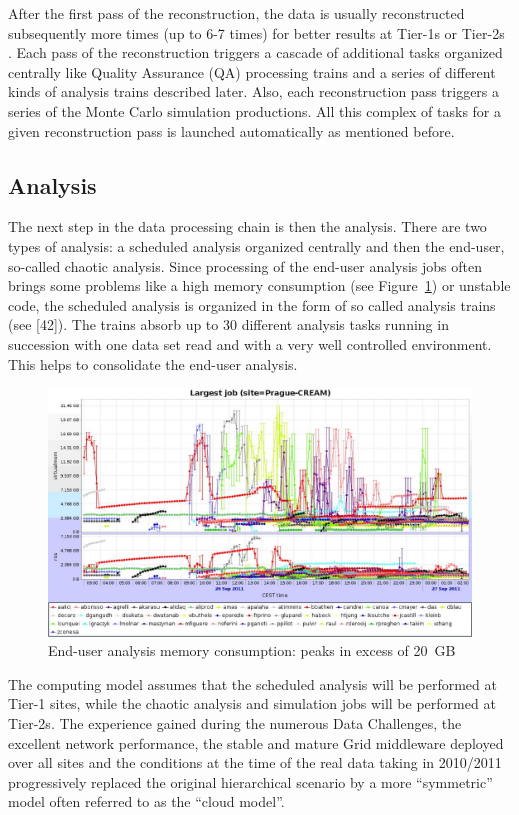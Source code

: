 After the first pass of the reconstruction, the data is usually
reconstructed subsequently more times (up to 6-7 times) for better
results at Tier-1s or Tier-2s . Each pass of the reconstruction
triggers a cascade of additional tasks organized centrally like
Quality Assurance (QA) processing trains and a series of different
kinds of analysis trains described later. Also, each reconstruction
pass triggers a series of the Monte Carlo simulation productions.
All this complex of tasks for a given reconstruction pass is
launched automatically as mentioned before.

\subsection{Analysis}
%
The next step in the data processing chain is then the analysis.
There are two types of analysis: a scheduled analysis organized
centrally and then the end-user, so-called chaotic analysis. Since
processing of the end-user analysis jobs often brings some problems
like a high memory consumption (see Figure~\ref{fig12}) or unstable
code, the scheduled analysis is organized in the form of so called
analysis trains (see [42]). The trains absorb up to 30 different
analysis tasks running in succession with one data set read and with
a very well controlled environment. This helps to consolidate the
end-user analysis.

\begin{figure}[htb] %
\centering
\includegraphics[width=13cm]{fig12.eps} %
\caption{End-user analysis memory consumption: peaks in excess of
20~GB}\label{fig12}
\end{figure}


The computing model assumes that the scheduled analysis will be
performed at Tier-1 sites, while the chaotic analysis and simulation
jobs will be performed at Tier-2s. The experience gained during the
numerous Data Challenges, the excellent network performance, the
stable and mature Grid middleware deployed over all sites and the
conditions at the time of the real data taking in 2010/2011
progressively replaced the original hierarchical scenario by a more
``symmetric'' model often referred to as the ``cloud model''.

